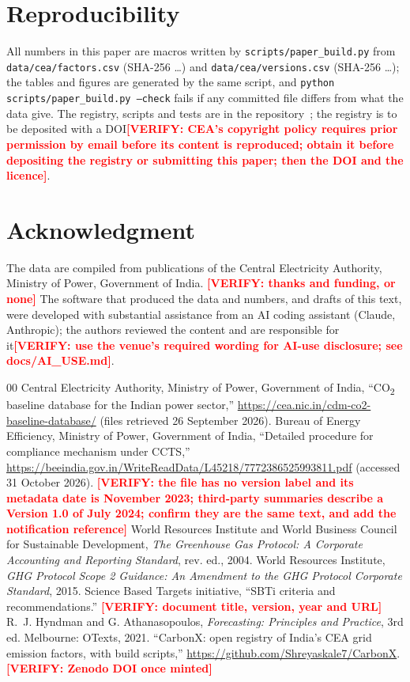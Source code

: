 \documentclass[conference]{IEEEtran}
\newcommand{\verify}[1]{\textcolor{red}{\textbf{[VERIFY: #1]}}}
\begin{document}
\section*{Reproducibility}
All numbers in this paper are macros written by \texttt{scripts/paper\_build.py} from \texttt{data/cea/factors.csv} (SHA-256 \shaFactors{}\ldots) and \texttt{data/cea/versions.csv} (SHA-256 \shaVersions{}\ldots); the tables and figures are generated by the same script, and \texttt{python scripts/paper\_build.py --check} fails if any committed file differs from what the data give. The registry, scripts and tests are in the repository~\cite{repo}; the registry is to be deposited with a DOI\verify{CEA's copyright policy requires prior permission by email before its content is reproduced; obtain it before depositing the registry or submitting this paper; then the DOI and the licence}.

\section*{Acknowledgment}
The data are compiled from publications of the Central Electricity Authority, Ministry of Power, Government of India. \verify{thanks and funding, or none} The software that produced the data and numbers, and drafts of this text, were developed with substantial assistance from an AI coding assistant (Claude, Anthropic); the authors reviewed the content and are responsible for it\verify{use the venue's required wording for AI-use disclosure; see docs/AI\_USE.md}.

\begin{thebibliography}{00}
 Central Electricity Authority, Ministry of Power, Government of India, ``CO\textsubscript{2} baseline database for the Indian power sector,'' \url{https://cea.nic.in/cdm-co2-baseline-database/} (files retrieved 26 September 2026).
 Bureau of Energy Efficiency, Ministry of Power, Government of India, ``Detailed procedure for compliance mechanism under CCTS,'' \url{https://beeindia.gov.in/WriteReadData/L45218/7772386525993811.pdf} (accessed 31 October 2026). \verify{the file has no version label and its metadata date is November 2023; third-party summaries describe a Version 1.0 of July 2024; confirm they are the same text, and add the notification reference}
 World Resources Institute and World Business Council for Sustainable Development, \emph{The Greenhouse Gas Protocol: A Corporate Accounting and Reporting Standard}, rev. ed., 2004.
 World Resources Institute, \emph{GHG Protocol Scope 2 Guidance: An Amendment to the GHG Protocol Corporate Standard}, 2015.
 Science Based Targets initiative, ``SBTi criteria and recommendations.'' \verify{document title, version, year and URL}
 R.~J. Hyndman and G. Athanasopoulos, \emph{Forecasting: Principles and Practice}, 3rd ed. Melbourne: OTexts, 2021.
 ``CarbonX: open registry of India's CEA grid emission factors, with build scripts,'' \url{https://github.com/Shreyaskale7/CarbonX}. \verify{Zenodo DOI once minted}
\end{thebibliography}
\end{document}
